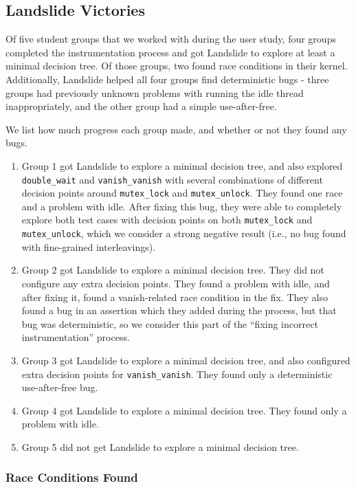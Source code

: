 \subsection{Landslide Victories}

Of five student groups that we worked with during the user study, four groups completed the instrumentation process and got Landslide to explore at least a minimal decision tree. Of those groups, two found race conditions in their kernel. Additionally, Landslide helped all four groups find deterministic bugs - three groups had previously unknown problems with running the idle thread inappropriately, and the other group had a simple use-after-free.

We list how much progress each group made, and whether or not they found any bugs.

\begin{enumerate}
	\item %
		Group 1 got Landslide to explore a minimal decision tree, and also explored \texttt{double\_wait} and \texttt{vanish\_vanish} with several combinations of different decision points around \texttt{mutex\_lock} and \texttt{mutex\_unlock}. They found one race and a problem with idle.
		After fixing this bug, they were able to completely explore both test cases with decision points on both \texttt{mutex\_lock} and \texttt{mutex\_unlock}, which we consider a strong negative result (i.e., no bug found with fine-grained interleavings).
	\item %
		Group 2 got Landslide to explore a minimal decision tree. They did not configure any extra decision points. They found a problem with idle, and after fixing it, found a vanish-related race condition in the fix. They also found a bug in an assertion which they added during the process, but that bug was deterministic, so we consider this part of the ``fixing incorrect instrumentation'' process.
	\item %
		Group 3 got Landslide to explore a minimal decision tree, and also configured extra decision points for \texttt{vanish\_vanish}. They found only a deterministic use-after-free bug.
	\item %
		Group 4 got Landslide to explore a minimal decision tree. They found only a problem with idle.
	\item %
		Group 5 did not get Landslide to explore a minimal decision tree.
\end{enumerate}

\subsubsection{Race Conditions Found}

